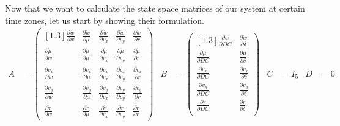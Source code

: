 \documentclass[a4paper, 11pt]{article}
\begin{document}
Now that we want to calculate the state space matrices of our system at certain time zones, let us start by showing their formulation.
\begin{align*}
	A &= \begin{pmatrix}[1.3]
		\frac{\partial \dot{w}}{\partial w} & \frac{\partial \dot{w}}{\partial \mu} & \frac{\partial \dot{w}}{\partial v_x} & \frac{\partial \dot{w}}{\partial v_y} & \frac{\partial \dot{w}}{\partial r}\\
		\frac{\partial \dot{\mu}}{\partial w} & \frac{\partial \dot{\mu}}{\partial \mu} & \frac{\partial \dot{\mu}}{\partial v_x} & \frac{\partial \dot{\mu}}{\partial v_y} & \frac{\partial \dot{\mu}}{\partial r}\\
		\frac{\partial \dot{v}_x}{\partial w} & \frac{\partial \dot{v}_x}{\partial \mu} & \frac{\partial \dot{v}_x}{\partial v_x} & \frac{\partial \dot{v}_x}{\partial v_y} & \frac{\partial \dot{v}_x}{\partial r}\\
		\frac{\partial \dot{v}_y}{\partial w} & \frac{\partial \dot{v}_y}{\partial \mu} & \frac{\partial \dot{v}_y}{\partial v_x} & \frac{\partial \dot{v}_y}{\partial v_y} & \frac{\partial \dot{v}_y}{\partial r}\\
		\frac{\partial \dot{r}}{\partial w} & \frac{\partial \dot{r}}{\partial \mu} & \frac{\partial \dot{r}}{\partial v_x} & \frac{\partial \dot{r}}{\partial v_y} & \frac{\partial \dot{r}}{\partial r}
	\end{pmatrix} & B &= \begin{pmatrix}[1.3]
		\frac{\partial \dot{w}}{\partial DC} & \frac{\partial \dot{w}}{\partial \delta} \\
		\frac{\partial \dot{\mu}}{\partial DC} & \frac{\partial \dot{\mu}}{\partial \delta} \\
		\frac{\partial \dot{v}_x}{\partial DC} & \frac{\partial \dot{v}_x}{\partial \delta} \\
		\frac{\partial \dot{v}_y}{\partial DC} & \frac{\partial \dot{v}_y}{\partial \delta} \\
		\frac{\partial \dot{r}}{\partial DC} & \frac{\partial \dot{r}}{\partial \delta} \\
	\end{pmatrix} & C &= I_5 & D &= 0
\end{align*}
\end{document}
